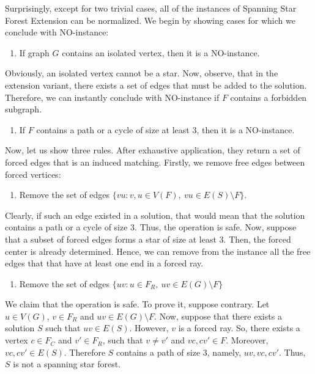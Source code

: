 \documentclass[en]{pracamgr}
\newcommand{\ssfep}{{\sc Spanning Star Forest Extension}}
\begin{document}
Surprisingly, except for two trivial cases, all of the instances of \ssfep{} can be normalized. We begin by showing cases for which we conclude with NO-instance:
\begin{enumerate}[leftmargin=*,label=\textbf{Reduction \arabic{enumi}},labelindent=0pt]
	\item If graph $G$ contains an isolated vertex, then it is a NO-instance.
\end{enumerate}

Obviously, an isolated vertex cannot be a star. Now, observe, that in the extension variant, there exists a set of edges that must be added to the solution. Therefore, we can instantly conclude with NO-instance if $F$ contains a forbidden subgraph.

\begin{enumerate}[leftmargin=*,label=\textbf{Reduction \arabic{enumi}},labelindent=0pt,resume]
	\item If $F$ contains a path or a cycle of size at least $3$, then it is a NO-instance.
\end{enumerate}

Now, let us show three rules. After exhaustive application, they return a set of forced edges that is an induced matching. Firstly, we remove free edges between forced vertices:

\begin{enumerate}[leftmargin=*,label=\textbf{Reduction \arabic{enumi}},labelindent=0pt,resume]
	\item Remove the set of edges $\{vu: v,u \in V(F),\ vu \in E(S) \setminus F\}$.
\end{enumerate}

Clearly, if such an edge existed in a solution, that would mean that the solution contains a path or a cycle of size $3$. Thus, the operation is safe. Now, suppose that a subset of forced edges forms a star of size at least $3$. Then, the forced center is already determined. Hence, we can remove from the instance all the free edges that that have at least one end in a forced ray. 

\begin{enumerate}[leftmargin=*,label=\textbf{Reduction \arabic{enumi}},resume,wide, labelwidth=!, labelindent=0pt]
	\item Remove the set of edges $\{uv: u \in F_R,\ uv \in E(G) \setminus F\}$
\end{enumerate}

We claim that the operation is safe. To prove it, suppose contrary. Let $u \in V(G)$, $v \in F_R$ and $uv \in E(G) \setminus F$. Now, suppose that there exists a solution $S$ such that $uv \in E(S)$. However, $v$ is a forced ray. So, there exists a vertex $c \in F_C$ and $v' \in F_R$, such that $v \neq v'$ and $vc,cv' \in F$. Moreover, $vc,cv' \in E(S)$. Therefore $S$ contains a path of size $3$, namely, $uv,vc,cv'$. Thus, $S$ is not a spanning star forest.
\end{document}
